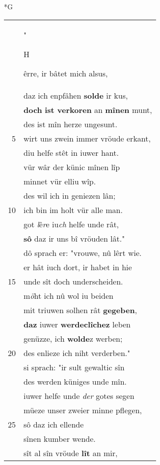 \documentclass[8pt,a4paper,notitlepage]{article}
\begin{document}
\begin{table}[ht]
\begin{minipage}[t]{0.5\linewidth}
\small
\begin{center}*G
\end{center}
\begin{tabular}{rl}
 & "\begin{large}H\end{large}êrre, ir bâtet mich alsus,\\ 
 & daz ich enpfâhen \textbf{solde} ir kus,\\ 
 & \textbf{doch} \textbf{ist verkoren} an \textbf{mînen} munt,\\ 
 & des ist mîn herze ungesunt.\\ 
5 & wirt uns zwein immer vröude erkant,\\ 
 & diu helfe stêt in iuwer hant.\\ 
 & vür wâr der künic mînen lîp\\ 
 & minnet vür elliu wîp.\\ 
 & des wil ich in geniezen lân;\\ 
10 & ich bin im holt vür alle man.\\ 
 & got \textit{l}ê\textit{r}e iu\textit{ch} helfe unde rât,\\ 
 & \textbf{sô} daz ir uns bî vröuden lât."\\ 
 & dô sprach er: "vrouwe, nû lêrt wie.\\ 
 & er hât iuch dort, ir habet in hie\\ 
15 & unde sît doch underscheiden.\\ 
 & m\textit{ö}ht ich nû wol iu beiden\\ 
 & mit triuwen solhen rât \textbf{gegeben},\\ 
 & \textbf{daz} iuwer \textbf{werdeclîchez} leben\\ 
 & genüzze, ich \textbf{wolde}z werben;\\ 
20 & des enlieze ich niht verderben."\\ 
 & si sprach: "ir sult gewaltic sîn\\ 
 & des werden küniges unde mîn.\\ 
 & iuwer helfe unde \textit{der} gotes segen\\ 
 & müeze unser zweier minne pflegen,\\ 
25 & sô daz ich ellende\\ 
 & sînen kumber wende.\\ 
 & sît al sîn vröude \textbf{lît} an mir,\\ 

\end{tabular}
\end{minipage}
\end{table}
\end{document}
